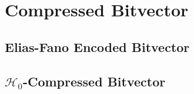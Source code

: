\section{Compressed Bitvector}

\subsection{Elias-Fano Encoded Bitvector}

\subsection{$\mathcal{H}_0$-Compressed Bitvector}
